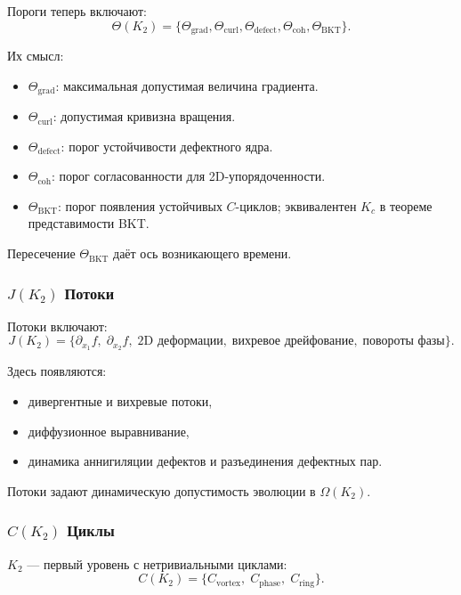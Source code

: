 Пороги теперь включают:
\[
\Theta(K_2) =
\{\Theta_{\mathrm{grad}}, \Theta_{\mathrm{curl}},
  \Theta_{\mathrm{defect}}, \Theta_{\mathrm{coh}},
  \Theta_{\mathrm{BKT}}\}.
\]

Их смысл:
\begin{itemize}
    \item $\Theta_{\mathrm{grad}}$: максимальная допустимая величина градиента.
    \item $\Theta_{\mathrm{curl}}$: допустимая кривизна вращения.
    \item $\Theta_{\mathrm{defect}}$: порог устойчивости дефектного ядра.
    \item $\Theta_{\mathrm{coh}}$: порог согласованности для 2D-упорядоченности.
    \item $\Theta_{\mathrm{BKT}}$: порог появления устойчивых $C$-циклов;
          эквивалентен $K_c$ в теореме представимости BKT.
\end{itemize}

Пересечение $\Theta_{\mathrm{BKT}}$ даёт ось возникающего времени.

\subsubsection{\texorpdfstring{$J(K_2)$}{J(K_2)} Потоки}

Потоки включают:
\[
J(K_2) = \{\partial_{x_1} f,\; \partial_{x_2} f,\;
\text{2D деформации},\; \text{вихревое дрейфование},\; \text{повороты фазы}\}.
\]

Здесь появляются:
\begin{itemize}
    \item дивергентные и вихревые потоки,
    \item диффузионное выравнивание,
    \item динамика аннигиляции дефектов и разъединения дефектных пар.
\end{itemize}

Потоки задают динамическую допустимость эволюции в $\Omega(K_2)$.

\subsubsection{\texorpdfstring{$C(K_2)$}{C(K_2)} Циклы}

$K_2$ — первый уровень с нетривиальными циклами:
\[
C(K_2) = \{C_{\mathrm{vortex}},\; C_{\mathrm{phase}},\; C_{\mathrm{ring}}\}.
\]

